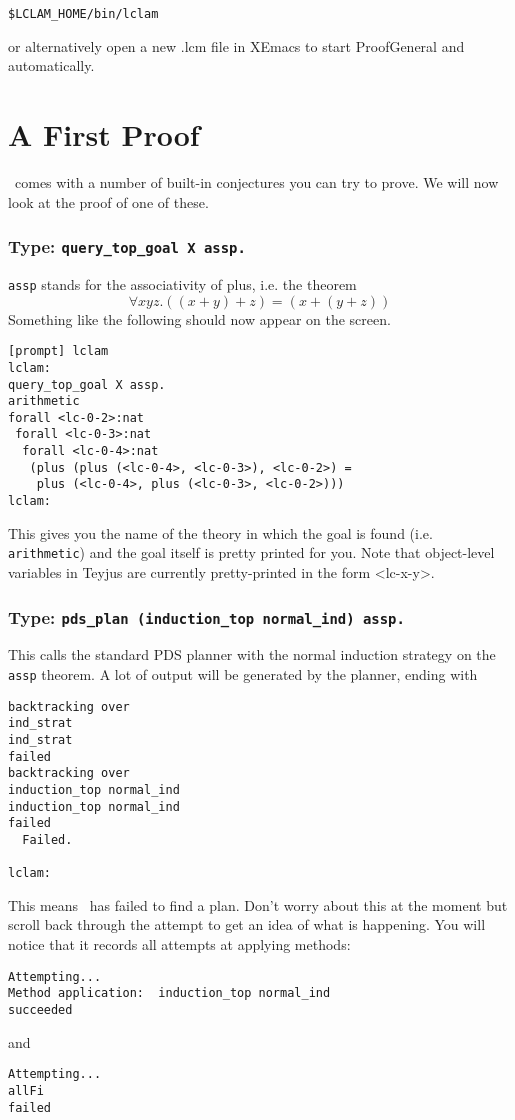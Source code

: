 \begin{verbatim}
$LCLAM_HOME/bin/lclam
\end{verbatim}
or alternatively open a new .lcm file in XEmacs to start ProofGeneral
and \lclam automatically.

\section{A First Proof}
\lclam\ comes with a number of built-in conjectures you can try to prove.  We will now look at the proof of
one of these.

\subsubsection*{Type: {\tt query\_top\_goal X assp.}}

{\tt assp} stands for the associativity of plus, i.e. the theorem
$$\forall x y z.  ((x + y) + z) = (x + (y + z))$$
Something like the following should now appear on the screen.  
\begin{verbatim}
[prompt] lclam
lclam:
query_top_goal X assp.
arithmetic
forall <lc-0-2>:nat
 forall <lc-0-3>:nat
  forall <lc-0-4>:nat
   (plus (plus (<lc-0-4>, <lc-0-3>), <lc-0-2>) =
    plus (<lc-0-4>, plus (<lc-0-3>, <lc-0-2>)))
lclam:
\end{verbatim}
This gives you the name of the theory in which the goal is found (i.e.
{\tt arithmetic}) and the goal itself is pretty printed for you.  Note
that object-level variables in Teyjus are currently pretty-printed in
the form <lc-x-y>.  

\subsubsection*{Type: {\tt pds\_plan (induction\_top normal\_ind)
assp.}}

This calls the standard PDS planner with the normal induction strategy
on the {\tt assp} theorem.  A lot of output will be generated by the planner, ending with
\begin{verbatim}
backtracking over
ind_strat
ind_strat
failed
backtracking over
induction_top normal_ind
induction_top normal_ind
failed
  Failed.

lclam:
\end{verbatim}
This means \lclam\ has failed to find a plan.  Don't worry about this
at the moment but scroll back through the attempt to get an idea of
what is happening.  You will notice that it records all attempts at
applying methods:
\begin{verbatim}
Attempting... 
Method application:  induction_top normal_ind
succeeded
\end{verbatim}
and 
\begin{verbatim}
Attempting... 
allFi
failed
\end{verbatim}

